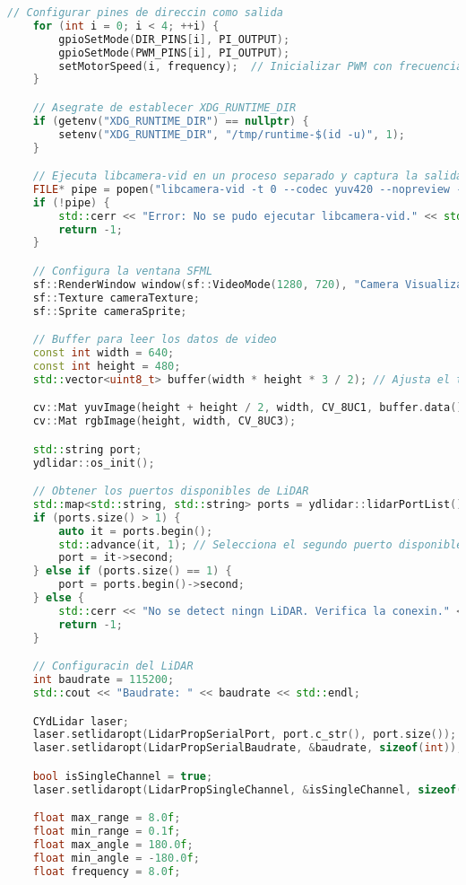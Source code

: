 \begin{lstlisting}[language={C++}, caption={Primer ajuste de c\'odigo}, label={Script}]
    // Configurar pines de direccin como salida
    for (int i = 0; i < 4; ++i) {
        gpioSetMode(DIR_PINS[i], PI_OUTPUT);
        gpioSetMode(PWM_PINS[i], PI_OUTPUT);
        setMotorSpeed(i, frequency);  // Inicializar PWM con frecuencia inicial
    }

    // Asegrate de establecer XDG_RUNTIME_DIR
    if (getenv("XDG_RUNTIME_DIR") == nullptr) {
        setenv("XDG_RUNTIME_DIR", "/tmp/runtime-$(id -u)", 1);
    }

    // Ejecuta libcamera-vid en un proceso separado y captura la salida en YUV, sin previsualizacn
    FILE* pipe = popen("libcamera-vid -t 0 --codec yuv420 --nopreview -o -", "r");
    if (!pipe) {
        std::cerr << "Error: No se pudo ejecutar libcamera-vid." << std::endl;
        return -1;
    }

    // Configura la ventana SFML
    sf::RenderWindow window(sf::VideoMode(1280, 720), "Camera Visualization with LiDAR");
    sf::Texture cameraTexture;
    sf::Sprite cameraSprite;

    // Buffer para leer los datos de video
    const int width = 640;
    const int height = 480;
    std::vector<uint8_t> buffer(width * height * 3 / 2); // Ajusta el tamao del buffer para YUV420

    cv::Mat yuvImage(height + height / 2, width, CV_8UC1, buffer.data());
    cv::Mat rgbImage(height, width, CV_8UC3);

    std::string port;
    ydlidar::os_init();

    // Obtener los puertos disponibles de LiDAR
    std::map<std::string, std::string> ports = ydlidar::lidarPortList();
    if (ports.size() > 1) {
        auto it = ports.begin();
        std::advance(it, 1); // Selecciona el segundo puerto disponible
        port = it->second;
    } else if (ports.size() == 1) {
        port = ports.begin()->second;
    } else {
        std::cerr << "No se detect ningn LiDAR. Verifica la conexin." << std::endl;
        return -1;
    }

    // Configuracin del LiDAR
    int baudrate = 115200;
    std::cout << "Baudrate: " << baudrate << std::endl;

    CYdLidar laser;
    laser.setlidaropt(LidarPropSerialPort, port.c_str(), port.size());
    laser.setlidaropt(LidarPropSerialBaudrate, &baudrate, sizeof(int));

    bool isSingleChannel = true;
    laser.setlidaropt(LidarPropSingleChannel, &isSingleChannel, sizeof(bool));

    float max_range = 8.0f;
    float min_range = 0.1f;
    float max_angle = 180.0f;
    float min_angle = -180.0f;
    float frequency = 8.0f;


\end{lstlisting}
